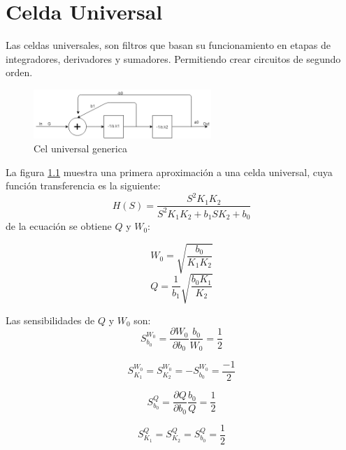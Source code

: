 \documentclass[../../tc_tp5_main.tex]{subfiles}
\begin{document}
\chapter{Celda Universal}

Las celdas universales, son filtros que basan su funcionamiento en etapas de integradores, derivadores y sumadores. Permitiendo crear circuitos de segundo orden.

\begin{figure}[H]	
	\centering
	\includegraphics[width=0.6\textwidth]{imagenes/uniGen.png}
	\caption{Cel universal generica}\label{fig:unigen}
\end{figure}

La figura \ref{fig:unigen} muestra una primera aproximación a una celda universal, cuya función transferencia es la siguiente:
$$ H(S)=\frac{S^2 K_1 K_2 }{S^2 K_1 K_2 + b_1 S K_2 + b_0 }$$
de la ecuación se obtiene $Q$ y $W_0$:

$$W_0=\sqrt{\frac{b_0}{K_1 K_2}}$$
$$Q=\frac{1}{b_1}\sqrt{\frac{b_0 K_1}{K_2}}$$

Las sensibilidades de $Q$ y $W_0$ son:
$$ S^{W_0}_{b_0}=\frac{ \partial W_0}{\partial b_0} \frac{b_0}{W_0}= \frac {1}{2}$$

$$ S^{W_0}_{K_1}= S^{W_0}_{K_2}= - S^{W_0}_{b_0}= \frac {-1}{2}$$

$$ S^{Q}_{b_0}=\frac{ \partial Q}{\partial b_0} \frac{b_0}{Q}= \frac {1}{2}$$

$$ S^{Q}_{K_1}= S^{Q}_{K_2}= S^{Q}_{b_0}= \frac {1}{2}$$

\clearpage\newpage
\end{document}
